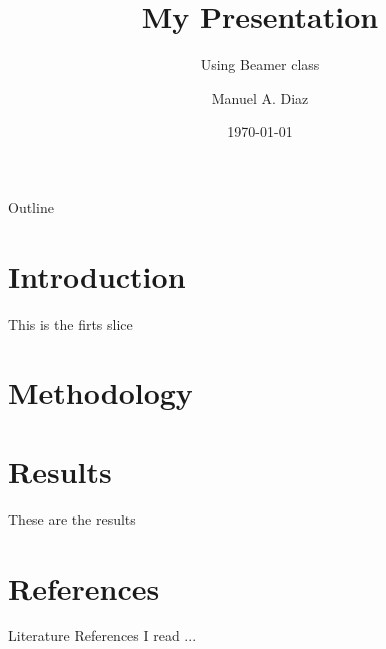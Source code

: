 \documentclass{beamer}
\title{My Presentation}
\subtitle{Using Beamer class}
\author{Manuel A. Diaz}
\institute{University of Poitiers}
\date{\today}
\begin{document}
\begin{frame}
    \titlepage
\end{frame}

\begin{frame}{Outline}
    \tableofcontents
\end{frame}

\section{Introduction}
\begin{frame}
    This is the firts slice
\end{frame}

\section{Methodology}
\begin{frame}
    {\small \lipsum[1]}
\end{frame}

\section{Results}
\begin{frame}
    These are the results
\end{frame}

\section{References}
\begin{frame}{Literature References}
    I read ...
\end{frame}
\end{document}
